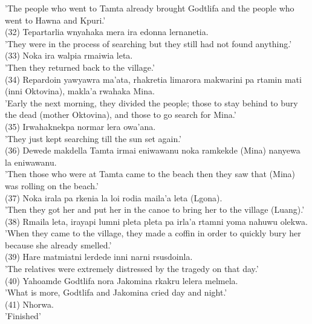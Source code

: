 \documentclass[10pt]{article}
\begin{document}
'The people who went to Tamta already brought Godtlifa and the people who went to Hawna and Kpuri.'\\
(32) Tepartarlia wnyahaka mera ira edonna lernanetia.\\
'They were in the process of searching but they still had not found anything.'\\
(33) Noka ira walpia rmaiwia leta.\\
'Then they returned back to the village.'\\
(34) Repardoin yawyawra ma'ata, rhakretia limarora makwarini pa rtamin mati (inni Oktovina), makla'a rwahaka Mina.\\
'Early the next morning, they divided the people; those to stay behind to bury the dead (mother Oktovina), and those to go search for Mina.'\\
(35) Irwahaknekpa normar lera owa'ana.\\
'They just kept searching till the sun set again.'\\
(36) Dewede makdella Tamta irmai eniwawanu noka ramkekde (Mina) nanyewa la eniwawanu.\\
'Then those who were at Tamta came to the beach then they saw that (Mina) was rolling on the beach.'\\
(37) Noka irala pa rkenia la loi rodia maila'a leta (Lgona).\\
'Then they got her and put her in the canoe to bring her to the village (Luang).'\\
(38) Rmaila leta, irayapi lumni pleta pleta pa irla'a rtamni yoma nahuwu olekwa.\\
'When they came to the village, they made a coffin in order to quickly bury her because she already smelled.'\\
(39) Hare matmiatni lerdede inni narni rsusdoinla.\\
'The relatives were extremely distressed by the tragedy on that day.'\\
(40) Yahoamde Godtlifa nora Jakomina rkakru lelera melmela.\\
'What is more, Godtlifa and Jakomina cried day and night.'\\
(41) Nhorwa.\\
'Finished'
\end{document}
